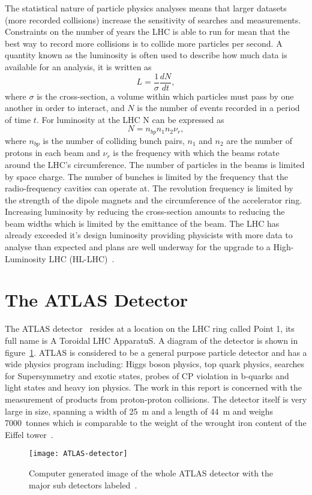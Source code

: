 The statistical nature of particle physics analyses means that larger datasets
(more recorded collisions) increase the sensitivity of searches and
measurements. Constraints on the number of years the LHC is able to run for mean
that the best way to record more collisions is to collide more particles per
second. A quantity known as the luminosity is often used to describe how much
data is available for an analysis, it is written as
\begin{equation}
  \label{eq:luminosity}
  L = \frac{1}{\sigma}\frac{dN}{dt},
\end{equation}
where $\sigma$ is the cross-section, a volume within which particles must pass
by one another in order to interact, and $N$ is the number of events recorded in
a period of time $t$. For luminosity at the LHC N can be expressed as
\begin{equation}
  \label{eq:lhc-lumi}
  N = n_{bp}n_{1}n_{2}\nu_{r},
\end{equation}
where $n_{bp}$ is the number of colliding bunch pairs, $n_{1}$ and $n_{2}$ are
the number of protons in each beam and $\nu_r$ is the frequency with which the
beams rotate around the LHC's circumference. The number of particles in the
beams is limited by space charge. The number of bunches is limited by the
frequency that the radio-frequency cavities can operate at. The revolution
frequency is limited by the strength of the dipole magnets and the circumference
of the accelerator ring. Increasing luminosity by reducing the cross-section
amounts to reducing the beam widths which is limited by the emittance of the
beam. The LHC has already exceeded it's design luminosity providing physicists
with more data to analyse than expected and plans are well underway for the
upgrade to a High-Luminosity LHC (HL-LHC)~\cite{hilumi-tdr}.

\section{The ATLAS Detector}%
\label{sec:atlas}

The ATLAS detector~\cite{ATLAS} resides at a location on the LHC ring called
Point 1, its full name is A Toroidal LHC ApparatuS. A diagram of the detector is
shown in figure~\ref{fig:ATLAS-det}. ATLAS is considered to be a general purpose
particle detector and has a wide physics program including: Higgs boson physics,
top quark physics, searches for Supersymmetry and exotic states, probes of CP
violation in b-quarks and light states and heavy ion physics. The work in this
report is concerned with the measurement of products from proton-proton
collisions. The detector itself is very large in size, spanning a width of 25~m
and a length of 44~m and weighs 7000~tonnes which is comparable to the weight of
the wrought iron content of the Eiffel tower~\cite{Eiffel-weight}.
\begin{figure}[h]
  \centering
  \texttt{[image: ATLAS-detector]}
  \caption[The ATLAS Detector]{Computer generated image of the whole ATLAS
    detector with the major sub detectors labeled~\cite{ATLAS-det-fig}.}%
  \label{fig:ATLAS-det}
\end{figure}


